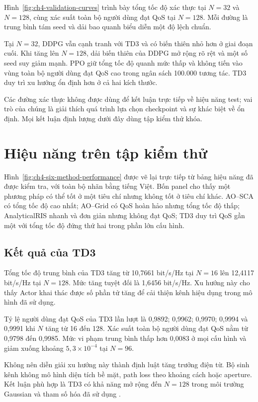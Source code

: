 Hình~\ref{fig:ch4-validation-curves} trình bày tổng tốc độ xác thực tại $N=32$ và $N=128$, cùng xác suất toàn bộ người dùng đạt QoS tại $N=128$. Mỗi đường là trung bình tám seed và dải bao quanh biểu diễn một độ lệch chuẩn.

Tại $N=32$, DDPG vẫn cạnh tranh với TD3 và có biến thiên nhỏ hơn ở giai đoạn cuối. Khi tăng lên $N=128$, dải biến thiên của DDPG mở rộng rõ rệt và một số seed suy giảm mạnh. PPO giữ tổng tốc độ quanh mức thấp và không tiến vào vùng toàn bộ người dùng đạt QoS cao trong ngân sách 100.000 tương tác. TD3 duy trì xu hướng ổn định hơn ở cả hai kích thước.

Các đường xác thực không được dùng để kết luận trực tiếp về hiệu năng test; vai trò của chúng là giải thích quá trình lựa chọn checkpoint và sự khác biệt về ổn định. Mọi kết luận định lượng dưới đây dùng tập kiểm thử khóa.

\section{Hiệu năng trên tập kiểm thử}




Hình~\ref{fig:ch4-six-method-performance} được vẽ lại trực tiếp từ bảng hiệu năng đã được kiểm tra, với toàn bộ nhãn bằng tiếng Việt. Bốn panel cho thấy một phương pháp có thể tốt ở một tiêu chí nhưng không tốt ở tiêu chí khác. AO--SCA có tổng tốc độ cao nhất; AO--Grid có QoS hoàn hảo nhưng tổng tốc độ thấp; AnalyticalRIS nhanh và đơn giản nhưng không đạt QoS; TD3 duy trì QoS gần một với tổng tốc độ đứng thứ hai trong phần lớn cấu hình.

\subsection{Kết quả của TD3}
Tổng tốc độ trung bình của TD3 tăng từ 10,7661 bit/s/Hz tại $N=16$ lên 12,4117 bit/s/Hz tại $N=128$. Mức tăng tuyệt đối là 1,6456 bit/s/Hz. Xu hướng này cho thấy Actor khai thác được số phần tử tăng để cải thiện kênh hiệu dụng trong mô hình đã sử dụng.

Tỷ lệ người dùng đạt QoS của TD3 lần lượt là 0,9892; 0,9962; 0,9970; 0,9994 và 0,9991 khi $N$ tăng từ 16 đến 128. Xác suất toàn bộ người dùng đạt QoS nằm từ 0,9798 đến 0,9985. Mức vi phạm trung bình thấp hơn 0,0083 ở mọi cấu hình và giảm xuống khoảng $5,3\times10^{-4}$ tại $N=96$.

Không nên diễn giải xu hướng này thành định luật tăng trưởng điện từ. Bộ sinh kênh không mô hình diện tích bề mặt, path loss theo khoảng cách hoặc aperture. Kết luận phù hợp là TD3 có khả năng mở rộng đến $N=128$ trong môi trường Gaussian và tham số hóa đã sử dụng \cite{Bjornson2020RISMyths,DiRenzo2020SmartRadio}.

